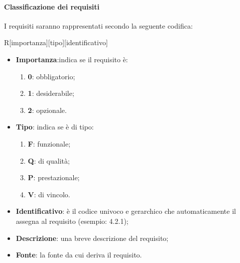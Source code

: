 		\paragraph{Classificazione  dei requisiti}
		I requisiti saranno rappresentati secondo la seguente codifica:
		\begin{center}
			R[importanza][tipo][identificativo]
		\end{center}
		\begin{itemize}
			\item \textbf{Importanza}:indica se il requisito è:
			\begin{enumerate}
				\item \textbf{0}: obbligatorio;
				\item \textbf{1}: desiderabile;
				\item \textbf{2}: opzionale.
			\end{enumerate}
			\item \textbf{Tipo}: indica se è di tipo:
			\begin{enumerate}
				\item \textbf{F}: funzionale;
				\item \textbf{Q}: di qualità;
				\item \textbf{P}: prestazionale;
				\item \textbf{V}: di vincolo.
			\end{enumerate}
			\item \textbf{Identificativo}: è il codice univoco e gerarchico che automaticamente il  assegna al requisito (esempio: 4.2.1);
			\item \textbf{Descrizione}: una breve descrizione del requisito;
			\item \textbf{Fonte}: la fonte da cui deriva il requisito.
		\end{itemize}
